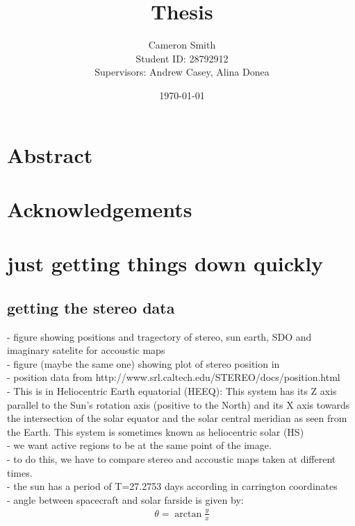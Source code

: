 \documentclass[a4paper,10pt]{report}
\title{Thesis}
\author{Cameron Smith\\
Student ID: 28792912\\
Supervisors: Andrew Casey, Alina Donea}
\date{\today}
\begin{document}
\maketitle

\chapter*{Abstract}



\chapter*{Acknowledgements}

\tableofcontents

\chapter{just getting things down quickly}

\section{getting the stereo data}
- figure showing positions and tragectory of stereo, sun earth, SDO and
imaginary satelite for accoustic maps\\
- figure (maybe the same one) showing plot of stereo position in \\
- position data from http://www.srl.caltech.edu/STEREO/docs/position.html \\
-  This is in Heliocentric Earth equatorial (HEEQ): This system has its Z axis
parallel to the Sun's rotation axis (positive to the North) and its X axis
towards the intersection of the solar equator and the solar central meridian as
seen from the Earth. This system is sometimes known as heliocentric solar (HS)\\
- we want active regions to be at the same point of the image.\\
 - to do this, we have to compare stereo and accoustic maps taken at different
 times. \\
 - the sun has a period of T=27.2753 days according in carrington coordinates \\
 - angle between spacecraft and solar farside is given by: \\

\begin{align}
  \theta = \arctan{\frac{y}{x}}
\end{align}
\end{document}

